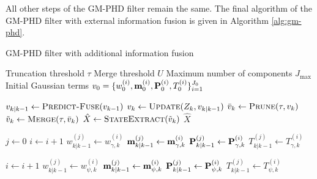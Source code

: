 All other steps of the GM-PHD filter remain the same. The final algorithm of the GM-PHD filter with external information fusion is given in Algorithm \ref{alg:gm-phd}.

\begin{algorithm}
\caption{GM-PHD filter with additional information fusion}\label{alg:gm-phd}
\begin{algorithmic}[1]
    \Require Truncation threshold $\tau$
    \Require Merge threshold $U$
    \Require Maximum number of components $J_\mathrm{max}$
    \Require Initial Gaussian terms $v_0 = \{ w_{0}^{(i)}, \vecat{m}{0}^{(i)}, \vecat{P}{0}^{(i)}, T_0^{(i)}\}_{i=1}^{J_0}$

    \item[]
    \label{alg:gm-phd:step}
        \State $v_{k|k-1} \gets \Call{Predict-Fuse}{v_{k-1}}$
        \State $v_{k} \gets \Call{Update}{Z_k, v_{k|k-1}}$ 
        \State $\bar{v}_k \gets \Call{Prune}{\tau, v_{k}}$ 
        \State $\tilde{v}_k \gets \Call{Merge}{\tau, \bar{v}_k}$ 
        \State $\hat{X} \gets \Call{StateExtract}{\tilde{v}_k}$ 
        \State \Return $\hat{X}$
    \EndProcedure
    
    \item[]
    \label{alg:gm-phd:predict-fuse}
        \State $j \gets 0$
         
            \State $i \gets i + 1$
            \State $w_{k|k-1}^{(j)} \gets w_{\gamma, k}^{(i)}$
            \State $\vecat{m}{k|k-1}^{(j)} \gets \vecat{m}{\gamma, k}^{(i)}$
            \State $\vecat{P}{k|k-1}^{(j)} \gets \vecat{P}{\gamma, k}^{(i)}$
            \State $T_{k|k-1}^{(j)} \gets T_{\gamma, k}^{(i)}$
        \EndFor

         
            \State $i \gets i + 1$
            \State $w_{k|k-1}^{(j)} \gets w_{\psi, k}^{(i)}$
            \State $\vecat{m}{k|k-1}^{(j)} \gets \vecat{m}{\psi, k}^{(i)}$
            \State $\vecat{P}{k|k-1}^{(j)} \gets \vecat{P}{\psi, k}^{(i)}$
            \State $T_{k|k-1}^{(j)} \gets T_{\psi, k}^{(i)}$
        \EndFor


\end{algorithmic}
\end{algorithm}
